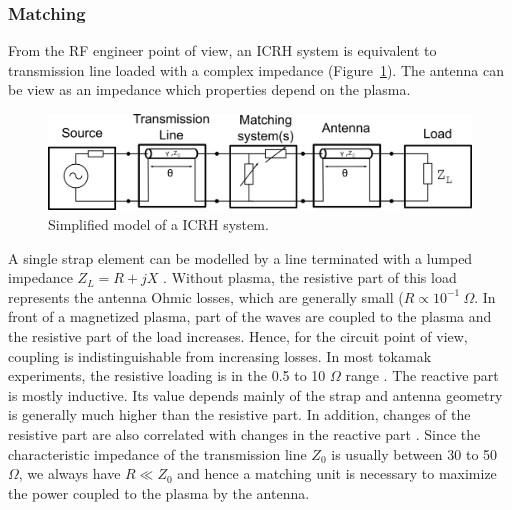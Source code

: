\subsubsection{Matching}\label{sec:ICRH_matching_systems}
From the RF engineer point of view, an ICRH system is equivalent to transmission line loaded with a complex impedance (Figure~\ref{fig:icrhantennacircuitmodel}). The antenna can be view as an impedance which properties depend on the plasma. 

\begin{figure}[h]
	\centering
	\includegraphics[width=0.9\linewidth]{figures/chap3/ICRH_antenna_circuit_model}
	\caption{Simplified model of a ICRH system.}
	\label{fig:icrhantennacircuitmodel}
\end{figure}

A single strap element can be modelled by a line terminated with a lumped impedance $Z_L = R + j X$ . Without plasma, the resistive part of this load represents the antenna Ohmic losses, which are generally small ($R \propto 10^{-1}~\si{\Omega}$. In front of a magnetized plasma, part of the waves are coupled to the plasma and the resistive part of the load increases. Hence, for the circuit point of view, coupling is indistinguishable from increasing losses. In most tokamak experiments, the resistive loading is in the 0.5 to 10 $\si{\Omega}$ range . The reactive part is mostly inductive. Its value depends mainly of the strap and antenna geometry is generally much higher than the resistive part. In addition, changes of the resistive part are also correlated with changes in the reactive part \cite{pinsker1998}. Since the characteristic impedance of the transmission line $Z_0$ is usually between 30 to 50~$\si{\Omega}$, we always have $R \ll Z_0$ and hence a matching unit is necessary to maximize the power coupled to the plasma by the antenna.

